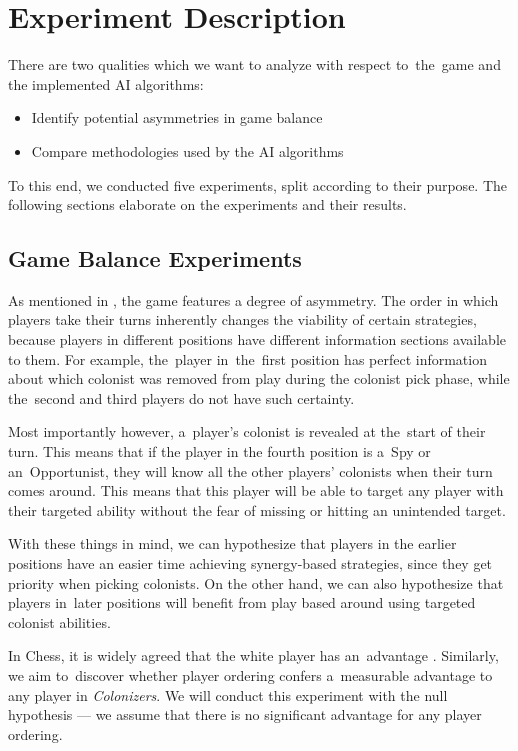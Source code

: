 \chapter{Experiment Description}

There are two qualities which we want to analyze with respect to~the~game
and the implemented AI algorithms:

\begin{itemize}
    \item Identify potential asymmetries in game balance
    \item Compare methodologies used by the AI algorithms
\end{itemize}

To this end, we conducted five experiments, split according to their purpose.
The following sections elaborate on the experiments and their results.

\section{Game Balance Experiments}

As mentioned in , the game features a degree of asymmetry.
The order in which players take their turns inherently changes the viability of certain
strategies, because players in different positions have different information sections
available to them. For example, the~player in~the~first position has perfect information
about which colonist was removed from play during the colonist pick phase, while
the~second and third players do not have such certainty.

Most importantly however, a~player's colonist is revealed at the~start of their
turn. This means that if the player in the fourth position is a~Spy or an~Opportunist,
they will know all the other players' colonists when their turn comes around.
This means that this player will be able to target any player with their targeted
ability without the fear of missing or hitting an unintended target.

With these things in mind, we can hypothesize that players in the earlier positions
have an easier time achieving synergy-based strategies, since they get priority
when picking colonists. On the other hand, we can also hypothesize that players in~later
positions will benefit from play based around using targeted colonist abilities.

In Chess, it is widely agreed that the white player has an~advantage \cite{Streeter46}. 
Similarly, we aim to~discover whether player ordering confers
a~measurable advantage to any player in \emph{Colonizers}.
We will conduct this experiment with the null hypothesis --- we assume
that there is no significant advantage for any player ordering.
\pagebreak

